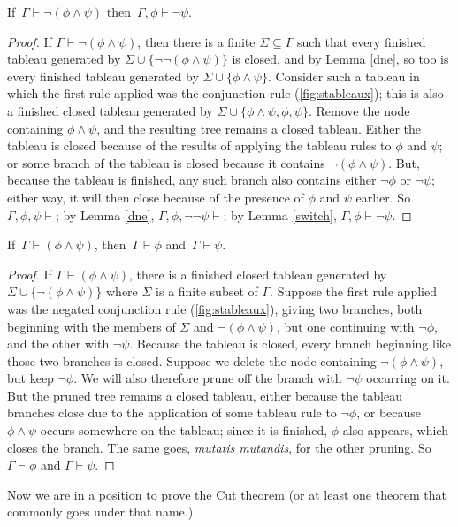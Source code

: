 \begin{lemma} \label{negcon}
	If\, $\Gamma \vdash \neg(\phi \wedge\psi)$ then\, $\Gamma, \phi \vdash \neg\psi$.
\end{lemma}
\begin{proof}
	If $\Gamma \vdash \neg(\phi \wedge\psi)$, then there is a finite $\Sigma\subseteq \Gamma$ such that every finished tableau generated by $\Sigma \cup \{¬¬(\phi\wedge\psi)\}$ is closed, and by Lemma \ref{dne}, so too is every finished tableau generated by $\Sigma \cup \{\phi\wedge\psi\}$. Consider such a tableau in which the first rule applied was the conjunction rule (\autoref{fig:stableaux}); this is also a finished closed tableau generated by $\Sigma \cup \{\phi\wedge\psi,\phi,\psi\}$. Remove the node containing $\phi\wedge\psi$, and the resulting tree remains a closed  tableau. Either the tableau is closed because of the results of applying the tableau rules to $\phi$ and $\psi$; or some branch of the tableau is closed because it contains $\neg(\phi\wedge\psi)$. But, because the tableau is finished, any such branch also contains either $\neg \phi$ or $\neg\psi$; either way, it will then close because of the presence of $\phi$ and $\psi$ earlier. So $\Gamma,\phi,\psi\vdash$; by Lemma \ref{dne}, $\Gamma,\phi,¬¬\psi\vdash$; by Lemma \ref{switch}, $\Gamma,\phi\vdash ¬\psi$.
\end{proof}

\begin{lemma} \label{con}
	If\, $\Gamma \vdash (\phi\wedge\psi)$, then\, $\Gamma \vdash \phi$ and\, $\Gamma \vdash \psi$.
\end{lemma}
\begin{proof}
	If $\Gamma \vdash (\phi\wedge\psi)$, there is a finished closed tableau generated by $\Sigma\cup\{\neg(\phi\wedge\psi)\}$ where $\Sigma$ is a finite subset of $\Gamma$. Suppose the first rule applied was the negated conjunction rule (\autoref{fig:stableaux}), giving two branches, both beginning with the members of $\Sigma$ and $\neg(\phi\wedge\psi)$, but one continuing with $\neg\phi$, and the other with $\neg\psi$. Because the tableau is closed, every branch beginning like those two branches is closed. Suppose we delete the node containing $\neg(\phi\wedge\psi)$, but keep $\neg\phi$. We will also therefore prune off the branch with $\neg\psi$ occurring on it. But the pruned tree remains a closed tableau, either because the tableau branches close due to the application of some tableau rule to $\neg\phi$, or because $\phi\wedge\psi$ occurs somewhere on the tableau; since it is finished, $\phi$ also appears, which  closes the branch. The same goes, \emph{mutatis mutandis}, for the other pruning. So $\Gamma\vdash \phi$ and $\Gamma\vdash \psi$.
\end{proof} 
Now we are in a position to prove the Cut theorem (or at least one theorem that commonly goes under that name.)


